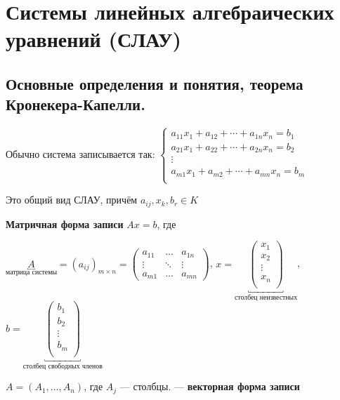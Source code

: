 \section{Системы линейных алгебраических уравнений (СЛАУ)}
\subsection{Основные определения и понятия, теорема Кронекера-Капелли.}
Обычно система записывается так:
\(\begin{cases}
    a_{11}x_1 + a_{12} + \cdots + a_{1n} x_n = b_1 \\

    a_{21}x_1 + a_{22} + \cdots + a_{2n} x_n = b_2 \\

    \vdots                                         \\

    a_{m1}x_1 + a_{m2} + \cdots + a_{mn} x_n = b_m \\
\end{cases}\)

Это общий вид СЛАУ, причём $a_{ij}, x_k, b_r\in K$

\textbf{Матричная форма записи} \(Ax = b\), где

\(\underbracket{A}_{\text{матрица системы}} = (a_{ij})_{m\times n} =
\begin{pmatrix}
    a_{11} & \ldots & a_{1n} \\
    \vdots & \ddots & \vdots \\
    a_{m1} & \ldots & a_{mn}
\end{pmatrix}\),
\(x = \underbracket{\begin{pmatrix}
    x_1 \\
    x_2 \\ \vdots \\ x_n \\
\end{pmatrix}}_{\text{столбец неизвестных}}\),
\(b = \underbracket{\begin{pmatrix}
    b_1 \\
    b_2 \\ \vdots \\ b_m \\
\end{pmatrix}}_{\text{столбец свободных членов}}\)

\(A = (A_1, \ldots, A_n)\), где $A_j$ --- столбцы.   --- \textbf{векторная форма записи}


